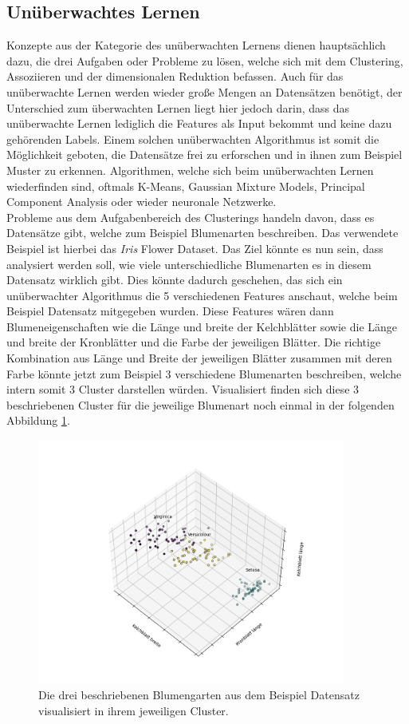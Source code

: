 \documentclass[]{iat}
\begin{document}
\subsection{Unüberwachtes Lernen} \label{sec:unueberwachtes_lernen}
Konzepte aus der Kategorie des unüberwachten Lernens dienen hauptsächlich dazu, die drei Aufgaben oder Probleme zu lösen, welche sich mit dem Clustering, Assoziieren und der dimensionalen Reduktion befassen. Auch für das unüberwachte Lernen werden wieder große Mengen an Datensätzen benötigt, der Unterschied zum überwachten Lernen liegt hier jedoch darin, dass das unüberwachte Lernen lediglich die Features als Input bekommt und keine dazu gehörenden Labels. Einem solchen unüberwachten Algorithmus ist somit die Möglichkeit geboten, die Datensätze frei zu erforschen und in ihnen zum Beispiel Muster zu erkennen. Algorithmen, welche sich beim unüberwachten Lernen wiederfinden sind, oftmals K-Means, Gaussian Mixture Models, Principal Component Analysis oder wieder neuronale Netzwerke.\\
Probleme aus dem Aufgabenbereich des Clusterings handeln davon, dass es Datensätze gibt, welche zum Beispiel Blumenarten beschreiben. Das verwendete Beispiel ist hierbei das \textit{Iris} Flower Dataset. \cite[]{Dua:2019} Das Ziel könnte es nun sein, dass analysiert werden soll, wie viele unterschiedliche Blumenarten es in diesem Datensatz wirklich gibt. Dies könnte dadurch geschehen, das sich ein unüberwachter Algorithmus die 5 verschiedenen Features anschaut, welche beim Beispiel Datensatz mitgegeben wurden. Diese Features wären dann Blumeneigenschaften wie die Länge und breite der Kelchblätter sowie die Länge und breite der Kronblätter und die Farbe der jeweiligen Blätter. Die richtige Kombination aus Länge und Breite der jeweiligen Blätter zusammen mit deren Farbe könnte jetzt zum Beispiel 3 verschiedene Blumenarten beschreiben, welche intern somit 3 Cluster darstellen würden. Visualisiert finden sich diese 3 beschriebenen Cluster für die jeweilige Blumenart noch einmal in der folgenden Abbildung \ref{abb:flower_example}.
\begin{figure}[H]
    \includegraphics[width=0.9\textwidth]{graphics/iris_set_groundtruth.png}
    \centering
    \caption{Die drei beschriebenen Blumengarten aus dem Beispiel Datensatz visualisiert in ihrem jeweiligen Cluster.}
    \label{abb:flower_example}
\end{figure}
\end{document}
